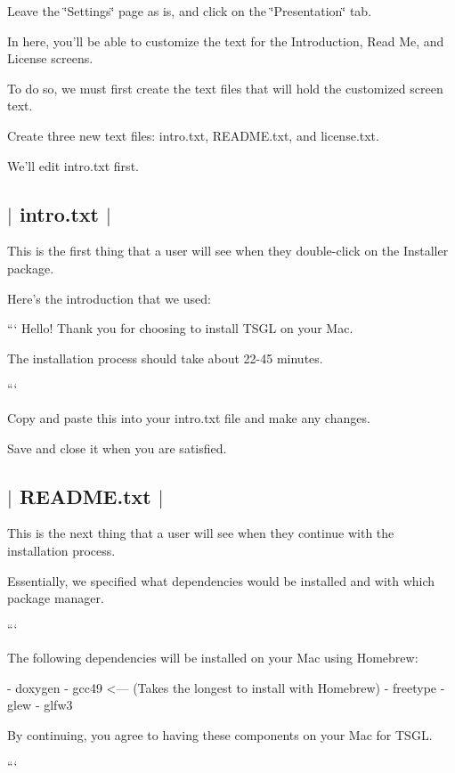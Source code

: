 Leave the \char`\"{}\-Settings\char`\"{} page as is, and click on the \char`\"{}\-Presentation\char`\"{} tab.

In here, you'll be able to customize the text for the Introduction, Read Me, and License screens.

To do so, we must first create the text files that will hold the customized screen text.

Create three new text files\-: intro.\-txt, R\-E\-A\-D\-M\-E.\-txt, and license.\-txt.

We'll edit intro.\-txt first. 

 \subsection*{$\vert$ intro.\-txt $\vert$ }

This is the first thing that a user will see when they double-\/click on the Installer package.

Here's the introduction that we used\-:

``` Hello! Thank you for choosing to install T\-S\-G\-L on your Mac.

The installation process should take about 22-\/45 minutes.

```

Copy and paste this into your intro.\-txt file and make any changes.

Save and close it when you are satisfied. 

 \subsection*{$\vert$ R\-E\-A\-D\-M\-E.\-txt $\vert$ }

This is the next thing that a user will see when they continue with the installation process.

Essentially, we specified what dependencies would be installed and with which package manager.

``` \begin{DoxyVerb}The following dependencies will be installed on your Mac using Homebrew:

    - doxygen
    - gcc49 <--- (Takes the longest to install with Homebrew)
    - freetype
    - glew
    - glfw3

By continuing, you agree to having these components on your Mac for TSGL. 
\end{DoxyVerb}


```

